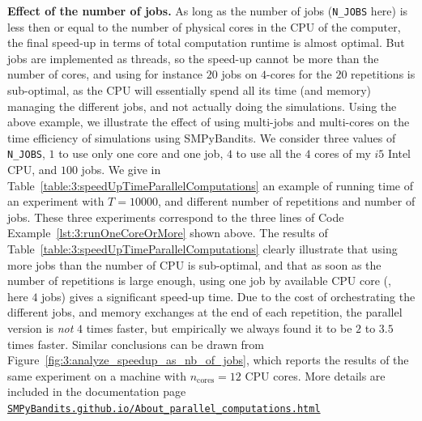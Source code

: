 \textbf{Effect of the number of jobs.}
%
As long as the number of jobs (\texttt{N\_JOBS} here) is less then or equal to the number of physical cores in the CPU of the computer, the final speed-up in terms of total computation runtime is almost optimal.
But jobs are implemented as threads, so the speed-up cannot be more than the number of cores, and using for instance $20$ jobs on $4$-cores for the $20$ repetitions is sub-optimal, as the CPU will essentially spend all its time (and memory) managing the different jobs, and not actually doing the simulations.
Using the above example, we illustrate the effect of using multi-jobs and multi-cores on the time efficiency of simulations using SMPyBandits. We consider three values of \texttt{N\_JOBS}, $1$ to use only one core and one job, $4$ to use all the $4$ cores of my $i5$ Intel CPU, and $100$ jobs.
%
We give in Table~\ref{table:3:speedUpTimeParallelComputations} an example of running time of an experiment with $T=10000$, and different number of repetitions and number of jobs.
These three experiments correspond to the three lines of Code Example~\ref{lst:3:runOneCoreOrMore} shown above.
%
The results of Table~\ref{table:3:speedUpTimeParallelComputations} clearly illustrate that using more jobs than the number of CPU is sub-optimal, and that as soon as the number of repetitions is large enough, using one job by available CPU core (\ie, here $4$ jobs) gives a significant speed-up time.
Due to the cost of orchestrating the different jobs, and memory exchanges at the end of each repetition, the parallel version is \emph{not} $4$ times faster, but empirically we always found it to be $2$ to $3.5$ times faster.
%
Similar conclusions can be drawn from Figure~\ref{fig:3:analyze_speedup_as_nb_of_jobs}, which reports the results of the same experiment on a machine with $n_{\text{cores}}=12$ CPU cores.
More details are included in the documentation page
\href{https://smpybandits.github.io/About_parallel_computations.html}{\texttt{SMPyBandits.github.io/About\_parallel\_computations.html}}


